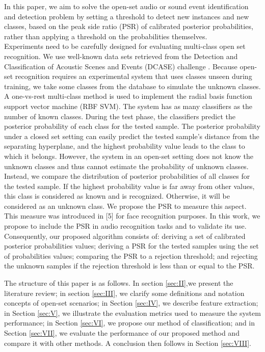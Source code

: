\documentclass{ieeeaccess}
\begin{document}
In this paper, we aim to solve the open-set audio or sound event identification and detection problem by setting a threshold to detect new instances and new classes, based on the peak side ratio (PSR) of calibrated posterior probabilities, rather than applying a threshold on the probabilities themselves. \\
Experiments need to be carefully designed for evaluating multi-class open set recognition. We use well-known data sets retrieved from the Detection and Classification of Acoustic Scenes and Events (DCASE) challenge  \cite{4}. Because open-set recognition requires an experimental system that uses classes unseen during training, we take some classes from the database to simulate the unknown classes. A one-vs-rest multi-class method is used to implement the radial basis function support vector machine (RBF SVM). The system has as many classifiers as the number of known classes. During the test phase, the classifiers predict the posterior probability of each class for the tested sample. The posterior probability under a closed set setting can easily predict the tested sample’s distance from the separating hyperplane, and the highest probability value leads to the class to which it belongs.  
However, the system in an open-set setting does not know the unknown classes and thus cannot estimate the probability of unknown classes. Instead, we compare the distribution of posterior probabilities of all classes for the tested sample. If the highest probability value is far away from other values, this class is considered as known and is recognized. Otherwise, it will be considered as an unknown class. We propose the PSR to measure this aspect. This measure was introduced in  \cite{5}[5] for face recognition purposes. In this work, we propose to include the PSR in audio recognition tasks and to validate its use. Consequently, our proposed algorithm consists of: deriving a set of calibrated posterior probabilities values; deriving a PSR for the tested samples using the set of probabilities values; comparing the PSR to a rejection threshold; and rejecting the unknown samples if the rejection threshold is less than or equal to the PSR. 

The structure of this paper is as follows. In section \ref{sec:II},we present the literature review; 
in section \ref{sec:III}, we clarify some definitions and notation concepts of open-set scenarios; 
in Section \ref{sec:IV}, we describe feature extraction; 
in Section \ref{sec:V}, we illustrate the evaluation metrics used to measure the system performance;
in Section \ref{sec:VI}, we propose our method of classification; 
and in Section \ref{sec:VII}, we evaluate the performance of our proposed method and compare it with other methods.
A conclusion then follows in Section \ref{sec:VIII}.
\end{document}
